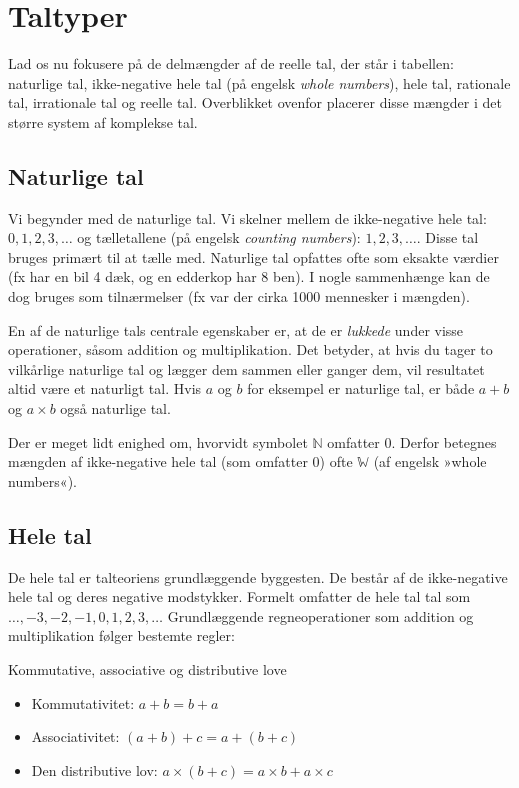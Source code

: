 \section{Taltyper}
Lad os nu fokusere på de delmængder af de reelle tal, der står i tabellen: naturlige tal, ikke-negative hele tal (på engelsk \emph{whole numbers}), hele tal, rationale tal, irrationale tal og reelle tal. Overblikket ovenfor placerer disse mængder i det større system af komplekse tal.

\subsection*{Naturlige tal}
Vi begynder med de naturlige tal. Vi skelner mellem de ikke-negative hele tal: $0, 1, 2, 3, \ldots$ og tælletallene (på engelsk \emph{counting numbers}): $1, 2, 3, \ldots$. Disse tal bruges primært til at tælle med. Naturlige tal opfattes ofte som eksakte værdier (fx har en bil 4 dæk, og en edderkop har 8 ben). I nogle sammenhænge kan de dog bruges som tilnærmelser (fx var der cirka 1000 mennesker i mængden).

En af de naturlige tals centrale egenskaber er, at de er \textit{lukkede} under visse operationer, såsom addition og multiplikation. Det betyder, at hvis du tager to vilkårlige naturlige tal og lægger dem sammen eller ganger dem, vil resultatet altid være et naturligt tal. Hvis $a$ og $b$ for eksempel er naturlige tal, er både $a + b$ og $a \times b$ også naturlige tal.

Der er meget lidt enighed om, hvorvidt symbolet $\mathbb{N}$ omfatter 0. Derfor betegnes mængden af ikke-negative hele tal (som omfatter 0) ofte $\mathbb{W}$ (af engelsk »whole numbers«).

\subsection*{Hele tal}
De hele tal er talteoriens grundlæggende byggesten. De består af de ikke-negative hele tal og deres negative modstykker. Formelt omfatter de hele tal tal som $\ldots,-3,-2,-1,0,1,2,3, \ldots$ Grundlæggende regneoperationer som addition og multiplikation følger bestemte regler:

\begin{custombox}{{Kommutative, associative og distributive love}}


    \begin{itemize}
    \item Kommutativitet: $a+b=b+a$
    \item Associativitet: $(a+b)+c=a+(b+c)$
    \item Den distributive lov: $a \times(b+c)=a \times b+a \times c$
    \end{itemize}
    
\end{custombox}

